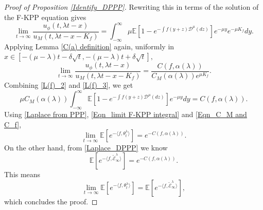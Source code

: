 \documentclass[a4paper,reqno]{amsart}%
\newcommand{\1}{\mathbf 1}
\theoremstyle{mine}
\numberwithin{theorem}{section}
\numberwithin{equation}{section}
\theoremstyle{remark}
\begin{document}
\begin{proof}[Proof of Proposition \ref{Identify_DPPP}]
Rewriting this in terms of the solution of the F-KPP equation gives
\begin{equation}\label{L(f)_2}
    \lim_{t\to\infty}\frac{u_{\phi}(t,\lambda t-x)}{u_{M}(t,\lambda t-x-K_f)} = \int_{-\infty}^{\infty}\mu \mathbb{E}[1-e^{-\int f(y+z)\mathcal{D}^{\mu}(dz) }]e^{-\mu y}e^{-\mu K_{f}}dy.
\end{equation}
Applying Lemma \ref{C(a) definition} again, uniformly in $x\in[-(\mu -\lambda)t-\delta\sqrt{t},-(\mu -\lambda)t+\delta\sqrt{t}],$
\begin{equation}\label{L(f)_3}
    \lim_{t\to\infty}\frac{u_{\phi}(t,\lambda t-x)}{u_{M}(t,\lambda t-x-K_f)} = \frac{C(f,\alpha(\lambda))}{C_{M}(\alpha(\lambda))e^{\mu K_f}}.
\end{equation}
Combining \eqref{L(f)_2} and \eqref{L(f)_3}, we get
\begin{equation} \label{Eqn_C_M and C_f}
   \mu C_{M}(\alpha(\lambda))\int_{-\infty}^{\infty}\mathbb{E}[1-e^{-\int f(y+z)\mathcal{D}^{\mu}(dz) }]e^{-\mu y}dy = C(f,\alpha(\lambda)).
\end{equation}
Using \eqref{Laplace from PPP}, \eqref{Eqn_limit F-KPP integral} and \eqref{Eqn_C_M and C_f},
\begin{equation}
    \lim_{t\to\infty}\mathbb{E}\left[e^{-\langle f,\theta^\lambda_t\rangle} \right] = e^{-C(f,\alpha(\lambda))}.
\end{equation}
On the other hand, from \eqref{Laplace_DPPP} we know
\begin{equation}
    \mathbb{E}\left[e^{-\langle f, \widetilde{\mathcal E}_{\infty}^\lambda\rangle} \right] = e^{-C(f,\alpha(\lambda))}.
\end{equation}
This means
\begin{equation}
    \lim_{t\to\infty}\mathbb{E}\left[e^{-\langle f,\theta^\lambda_t\rangle} \right] = \mathbb{E}\left[e^{-\langle f, \widetilde{\mathcal E}_{\infty}^\lambda\rangle} \right],
\end{equation}
which concludes the proof.
\end{proof}
\end{document}

